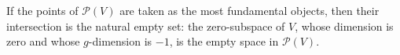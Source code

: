If the points of $\mathcal{P}(V)$ are taken as the most fundamental objects, then their intersection is the natural empty set: the zero-subspace of $V$, whose dimension is zero and whose $g$-dimension is $-1$, is the empty space in $\mathcal{P}(V)$.
